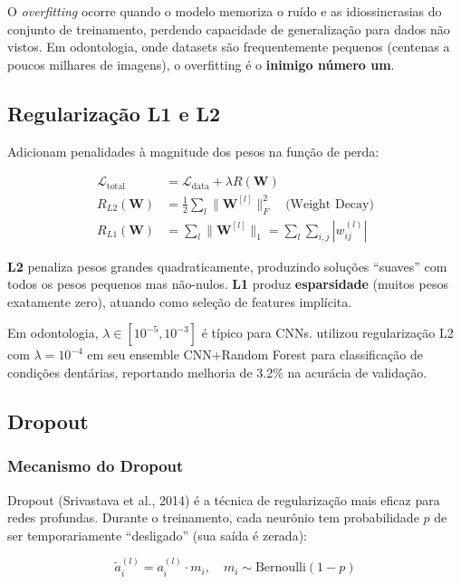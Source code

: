 O \textit{overfitting} ocorre quando o modelo memoriza o ruído e as idiossincrasias
do conjunto de treinamento, perdendo capacidade de generalização para dados não
vistos. Em odontologia, onde datasets são frequentemente pequenos (centenas a
poucos milhares de imagens), o overfitting é o \textbf{inimigo número um}.

\subsection{Regularização L1 e L2}

Adicionam penalidades à magnitude dos pesos na função de perda:

\begin{align}
  \mathcal{L}_{\text{total}} &= \mathcal{L}_{\text{data}} + \lambda R(\mathbf{W}) \label{eq:regularized-loss} \\
  R_{L2}(\mathbf{W}) &= \frac{1}{2} \sum_{l} \|\mathbf{W}^{[l]}\|_F^2 \quad \text{(Weight Decay)} \label{eq:l2} \\
  R_{L1}(\mathbf{W}) &= \sum_{l} \|\mathbf{W}^{[l]}\|_1 = \sum_{l} \sum_{i,j} |w_{ij}^{(l)}| \label{eq:l1}
\end{align}

\textbf{L2} penaliza pesos grandes quadraticamente, produzindo soluções ``suaves''
com todos os pesos pequenos mas não-nulos. \textbf{L1} produz \textbf{esparsidade}
(muitos pesos exatamente zero), atuando como seleção de features implícita.

Em odontologia, $\lambda \in [10^{-5}, 10^{-3}]$ é típico para CNNs.
 utilizou regularização L2 com $\lambda=10^{-4}$ em
seu ensemble CNN+Random Forest para classificação de condições dentárias,
reportando melhoria de 3.2\% na acurácia de validação.

\subsection{Dropout}

\subsubsection{Mecanismo do Dropout}

Dropout (Srivastava et al., 2014) é a técnica de regularização mais eficaz para
redes profundas. Durante o treinamento, cada neurônio tem probabilidade $p$ de
ser temporariamente ``desligado'' (sua saída é zerada):

\begin{equation}
  \tilde{a}_i^{(l)} = a_i^{(l)} \cdot m_i, \quad m_i \sim \text{Bernoulli}(1-p)
  \label{eq:dropout}
\end{equation}

